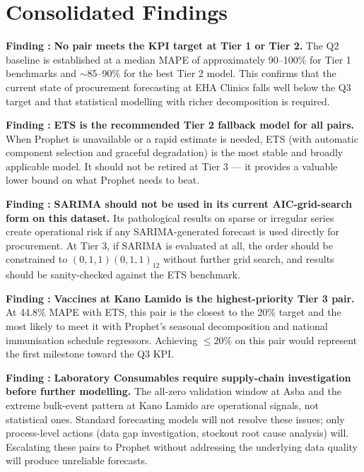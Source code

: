 \documentclass[12pt, a4paper]{article}
\newcounter{finding}
\newcommand{\finding}[1]{%
  \stepcounter{finding}%
  \begin{mdframed}[style=greenbox]
  \textbf{Finding \thefinding:} #1
  \end{mdframed}%
}
\begin{document}
\section{Consolidated Findings}

\finding{%
  \textbf{No pair meets the KPI target at Tier 1 or Tier 2.}
  The Q2 baseline is established at a median MAPE of approximately
  90--100\% for Tier 1 benchmarks and $\sim$85--90\% for the best
  Tier 2 model. This confirms that the current state of procurement
  forecasting at EHA Clinics falls well below the Q3 target and that
  statistical modelling with richer decomposition is required.
}

\finding{%
  \textbf{ETS is the recommended Tier 2 fallback model for all pairs.}
  When Prophet is unavailable or a rapid estimate is needed, ETS
  (with automatic component selection and graceful degradation) is
  the most stable and broadly applicable model. It should not be retired
  at Tier 3 --- it provides a valuable lower bound on what Prophet needs
  to beat.
}

\finding{%
  \textbf{SARIMA should not be used in its current AIC-grid-search form
  on this dataset.} Its pathological results on sparse or irregular series
  create operational risk if any SARIMA-generated forecast is used
  directly for procurement. At Tier 3, if SARIMA is evaluated at all,
  the order should be constrained to $(0,1,1)(0,1,1)_{12}$ without
  further grid search, and results should be sanity-checked against the
  ETS benchmark.
}

\finding{%
  \textbf{Vaccines at Kano Lamido is the highest-priority Tier 3 pair.}
  At 44.8\% MAPE with ETS, this pair is the closest to the 20\% target
  and the most likely to meet it with Prophet's seasonal decomposition
  and national immunisation schedule regressors. Achieving $\leq 20\%$
  on this pair would represent the first milestone toward the Q3 KPI.
}

\finding{%
  \textbf{Laboratory Consumables require supply-chain investigation before
  further modelling.} The all-zero validation window at Asba and the extreme
  bulk-event pattern at Kano Lamido are operational signals, not statistical
  ones. Standard forecasting models will not resolve these issues; only
  process-level actions (data gap investigation, stockout root cause analysis)
  will. Escalating these pairs to Prophet without addressing the underlying
  data quality will produce unreliable forecasts.
}
\end{document}
